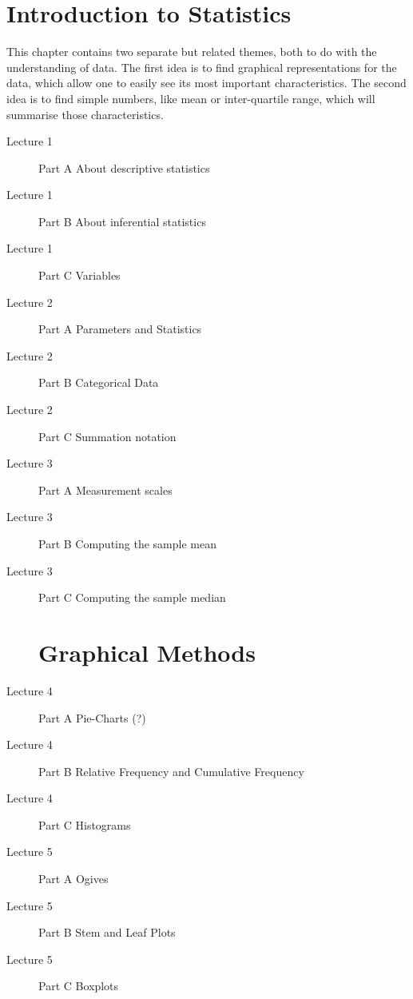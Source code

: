 \documentclass[12pt]{article}
\title{}
\author{}
\begin{document}
\maketitle
\tableofcontents

\newpage
\section{Introduction to Statistics}
This chapter contains two separate but related themes, both to do with the
understanding of data. The ﬁrst idea is to ﬁnd graphical representations for the data,
which allow one to easily see its most important characteristics. The second idea is to
ﬁnd simple numbers, like mean or inter-quartile range, which will summarise those
characteristics.

\begin{description}
\item[	Lecture	1	]	Part A	About descriptive statistics
\item[	Lecture	1	]	Part B	About inferential statistics
\item[	Lecture	1	]	Part C	Variables
\item[	Lecture	2	]	Part A	Parameters and Statistics
\item[	Lecture	2	]	Part B	Categorical Data
\item[	Lecture	2	]	Part C	Summation notation
\item[	Lecture	3	]	Part A	Measurement scales
\item[	Lecture	3	]	Part B	Computing the sample mean
\item[	Lecture	3	]	Part C	Computing the sample median





\newpage
\section{Graphical Methods}
\end{description}
\begin{description}
\item[	Lecture	4	]	Part A	Pie-Charts (?)
\item[	Lecture	4	]	Part B	Relative Frequency and Cumulative Frequency
\item[	Lecture	4	]	Part C	Histograms
\item[	Lecture	5	]	Part A	Ogives
\item[	Lecture	5	]	Part B	Stem and Leaf Plots
\item[	Lecture	5	]	Part C	Boxplots
\end{description}
\end{document}
